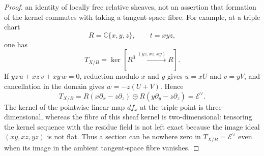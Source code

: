 \begin{proof}
an identity of locally free relative sheaves, not an assertion that formation
of the kernel commutes with taking a tangent-space fibre.  For example, at a
triple chart
\[
 R=\mathbb C\{x,y,z\},\qquad t=xyz,
\]
one has
\[
 T_{X/B}=\ker\!\left[R^3\xrightarrow{(yz,xz,xy)}R\right].
\]
If $yz\,u+xz\,v+xy\,w=0$, reduction modulo $x$ and $y$ gives
$u=xU$ and $v=yV$, and cancellation in the domain gives
$w=-z(U+V)$.  Hence
\[
 T_{X/B}
 =R(x\partial_x-z\partial_z)\oplus
  R(y\partial_y-z\partial_z)
 =\mathcal E^\vee.
\]
The kernel of the pointwise linear map $df_x$ at the triple point is
three-dimensional, whereas the fibre of this sheaf kernel is
two-dimensional: tensoring the kernel sequence with the residue field is
not left exact because the image ideal $(xy,xz,yz)$ is not flat.  Thus a
section can be nowhere zero in $T_{X/B}=\mathcal E^\vee$ even when its image
in the ambient tangent-space fibre vanishes.


\end{proof}
